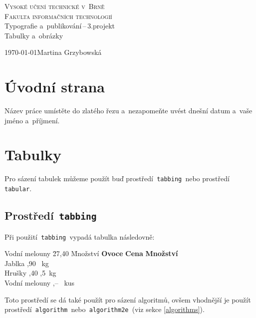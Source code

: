 \documentclass[a4paper,11pt,titlepage]{article}
\begin{document}
	\begin{titlepage}
		\begin{center}
			{\Huge\textsc{Vysoké učení technické v~Brně}}\\
			\vspace{+0.8em}
			{\huge\textsc{Fakulta informačních technologií}}\\
			\bigskip
			\LARGE{Typografie a~publikování\,--\,3.projekt}\\
			\vspace{-0.25em}
			\Huge{Tabulky a~obrázky}
		\end{center}
		{\Large \today \hfill Martina Grzybowská}
	\end{titlepage}

\newpage
\pagestyle{plain}
\section{Úvodní strana}
	Název práce umístěte do zlatého řezu a~nezapomeňte uvést dnešní datum a~vaše jméno a~příjmení.

\section{Tabulky}
	Pro sázení tabulek můžeme použít buď prostředí\texttt{ tabbing }nebo prostředí\texttt{ tabular}.

	\subsection{Prostředí\texttt{ tabbing }}
		Při použití\texttt{ tabbing }vypadá tabulka následovně:
		\begin{tabbing}
			
			Vodní melouny \quad \= 27,40 \quad \= Množství \kill
			\textbf{Ovoce} \> \textbf{Cena} \> \textbf{Množství}\\
				Jablka ,90 \ kg\\
				Hrušky ,40 ,5\ kg\\
				Vodní melouny ,-- \ kus\\
		\end{tabbing}
		
		\noindent Toto prostředí se dá také použít pro sázení algoritmů, ovšem vhodnější je použít prostředí\texttt{ algorithm }nebo\texttt{ algorithm2e }(viz sekce \ref{algorithms}).
	
\end{document}
